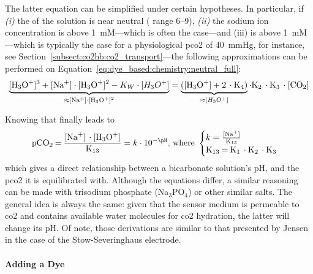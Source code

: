 The latter equation can be simplified under certain hypotheses. In particular, if \textit{(i)} the \pH{} of the solution is near neutral (\pH{} range 6--9), \textit{(ii)} the sodium  ion concentration is above 1~mM---which is often the case\cite{opitz1984, zhujun1984b}---and (iii) \ce{[CO_2]} is above 1~mM---which is typically the case for a physiological \gls{pco2} of 40~mmHg, for instance, see Section~\ref{subsect:co2hb:co2_transport}---the following approximations can be performed on Equation~\ref{eq:dye_based:chemistry:neutral_full}:
\begin{equation}
	\underbrace{\ce{[H_3O^+]^3 + [Na^+]\cdot[H_3O^+]^2}- K_W \cdot [H_3O^+]}_{\approx \ce{[Na^+]\cdot [H_3O^+]^2}} = \underbrace{(\ce{[H_3O^+] + 2 \cdot K_4})}_{\approx [H_3O^+]}\cdot \ce{K_2 \cdot K_3 \cdot [CO_2]}
\end{equation}

Knowing that  finally leads to
\begin{equation}\label{eq:choos:dye_based:chemistry:pco2_pH_link}
	\ce{pCO_2 = \frac{[Na^+] \cdot [H_3O^+]}{K_13}} = k \cdot 10^{-\pH}\text{, where }
	\begin{cases}
		k = \ce{\frac{[Na^+]}{K_13}}\\
		\ce{K_{13} = K_1 \cdot K_2 \cdot K_3}
	\end{cases}
\end{equation}
which gives a direct relationship between a bicarbonate solution's pH, and the \gls{pco2} it is equilibrated with. Although the equations differ, a similar reasoning can be made with trisodium phosphate (Na$_3$PO$_4$) or other similar salts. The general idea is always the same: given that the sensor medium is permeable to \gls{co2} and contains available water molecules for \gls{co2} hydration, the latter will change its pH. Of note, those derivations are similar to that presented by Jensen \etal{} in the case of the Stow-Severinghaus electrode\cite{jensen1979}.

\paragraph{Adding a Dye}\mbox{}\\

